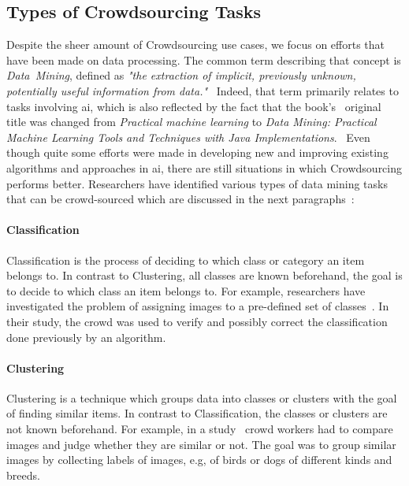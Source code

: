 \subsection{Types of Crowdsourcing Tasks}
Despite the sheer amount of Crowdsourcing use cases, we focus on efforts that have been made on data processing. The common term describing that concept is \emph{Data~Mining}, defined as \emph{"the extraction of implicit, previously unknown, potentially useful information from data."}~\cite{witten2016}
Indeed, that term primarily relates to tasks involving \gls{ai}, which is also reflected by the fact that the book's~\cite{witten2000} original title was changed from \emph{Practical machine learning} to \emph{Data Mining: Practical Machine Learning Tools and Techniques with Java Implementations}.~\cite{bouckaert2010} Even though quite some efforts were made in developing new and improving existing algorithms and approaches in \gls{ai}, there are still situations in which Crowdsourcing performs better. Researchers have identified various types of data mining tasks that can be crowd-sourced which are discussed in the next paragraphs~\cite{xintong2014, barbier2012, sabou2012}:

\paragraph{Classification} Classification is the process of deciding to which class or category an item belongs to. In contrast to Clustering, all classes are known beforehand, the goal is to decide to which class an item belongs to. For example, researchers have investigated the problem of assigning images to a pre-defined set of classes~\cite{herrera2014}. In their study, the crowd was used to verify and possibly correct the classification done previously by an algorithm. 

\paragraph{Clustering} Clustering is a technique which groups data into classes or clusters with the goal of finding similar items. In contrast to Classification, the classes or clusters are not known beforehand.
For example, in a study~\cite{vinayak2016} crowd workers had to compare images and judge whether they are similar or not. The goal was to group similar images by collecting labels of images, e.g, of birds or dogs of different kinds and breeds. 

